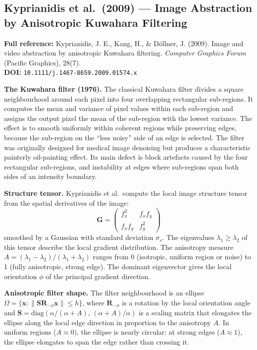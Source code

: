 \documentclass[11pt, a4paper]{article}
\begin{document}
\vspace{8pt}
\subsection{Kyprianidis et al.\ (2009) --- Image Abstraction by Anisotropic Kuwahara Filtering}

\begin{refbox}
\textbf{Full reference:} Kyprianidis, J. E., Kang, H., \& D\"{o}llner, J. (2009). Image and video abstraction by anisotropic Kuwahara filtering. \textit{Computer Graphics Forum} (Pacific Graphics), 28(7).\\[4pt]
\textbf{DOI:} \texttt{10.1111/j.1467-8659.2009.01574.x}
\end{refbox}

\textbf{The Kuwahara filter (1976).} The classical Kuwahara filter divides a square neighbourhood around each pixel into four overlapping rectangular sub-regions. It computes the mean and variance of pixel values within each sub-region and assigns the output pixel the mean of the sub-region with the lowest variance. The effect is to smooth uniformly within coherent regions while preserving edges, because the sub-region on the ``less noisy'' side of an edge is selected. The filter was originally designed for medical image denoising but produces a characteristic painterly oil-painting effect. Its main defect is block artefacts caused by the four rectangular sub-regions, and instability at edges where sub-regions span both sides of an intensity boundary.

\textbf{Structure tensor.} Kyprianidis et al.\ compute the local image structure tensor from the spatial derivatives of the image:
\[
  \mathbf{G} = \begin{pmatrix} f_x^2 & f_x f_y \\ f_x f_y & f_y^2 \end{pmatrix}
\]
smoothed by a Gaussian with standard deviation $\sigma_s$. The eigenvalues $\lambda_1 \geq \lambda_2$ of this tensor describe the local gradient distribution. The anisotropy measure $A = (\lambda_1 - \lambda_2)/(\lambda_1 + \lambda_2)$ ranges from 0 (isotropic, uniform region or noise) to 1 (fully anisotropic, strong edge). The dominant eigenvector gives the local orientation $\phi$ of the principal gradient direction.

\textbf{Anisotropic filter shape.} The filter neighbourhood is an ellipse $\Omega = \{\mathbf{x} : \|\mathbf{S}\mathbf{R}_{-\phi}\mathbf{x}\| \leq h\}$, where $\mathbf{R}_{-\phi}$ is a rotation by the local orientation angle and $\mathbf{S} = \text{diag}(\alpha/(\alpha+A),\, (\alpha+A)/\alpha)$ is a scaling matrix that elongates the ellipse along the local edge direction in proportion to the anisotropy $A$. In uniform regions ($A \approx 0$), the ellipse is nearly circular; at strong edges ($A \approx 1$), the ellipse elongates to span the edge rather than crossing it.
\end{document}
